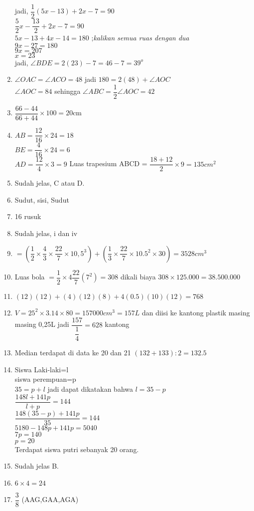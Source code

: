 \documentclass[10pt,a4paper]{article}
\begin{document}
\begin{enumerate}
		  jadi, $\dfrac{1}{2}(5x-13)+2x-7=90$\medskip \\
			    $\dfrac{5}{2}x-\dfrac{13}{2}+2x-7=90$ \medskip \\ 
			    $5x-13+4x-14=180$ ;\textit{kalikan semua ruas dengan dua}\\
			    $9x-27=180$\\
			    $9x=207$\\
			    $x=23$\\
		  jadi, $\angle BDE=2(23)-7=46-7=39^o$
	 \item $\angle OAC=\angle ACO= 48$ jadi $180=2(48)+ \angle AOC$\\
		   $\angle AOC=84$ sehingga $\angle ABC=\dfrac{1}{2} \angle AOC= 42$
	 \item $\dfrac{66-44}{66+44}\times 100 = 20 $cm 
	 \item $AB=\dfrac{12}{16}\times 24= 18$\\
		   $BE=\dfrac{4}{16}\times 24= 6$\\
		   $AD=\dfrac{12}{4}\times 3= 9$
		   Luas trapesium ABCD = $\dfrac{18+12}{2}\times 9=135cm^2 $
	\item Sudah jelas, C atau D.
	\item Sudut, sisi, Sudut
	\item 16 rusuk
	\item Sudah jelas, i dan iv
	\item $=(\dfrac{1}{2}\times \dfrac{4}{3}\times \dfrac{22}{7} \times 10,5^3)+(\dfrac{1}{3}\times \dfrac{22}{7}\times 10.5^2 \times 30)=3528cm^3$
	\item Luas bola $=\dfrac{1}{2}\times 4\dfrac{22}{7}(7^2)=308$ dikali biaya $308\times 125.000=38.500.000$
	\item $(12)(12)+(4)(12)(8)+4(0.5)(10)(12)=768$
	\item $V=25^2\times 3.14\times 80=157000cm^3=157L$ dan diisi ke kantong plastik masing masing 0,25L jadi $\dfrac{157}{\dfrac{1}{4}}=628$ kantong
	\item Median terdapat di data ke 20 dan 21 $(132+133):2=132.5 $
	\item Siswa Laki-laki=l\\ siswa perempuan=p\\
		  $35=p+l$ jadi dapat dikatakan bahwa $l=35-p$\medskip \\
		 $\dfrac{148l+141p}{l+p}=144$\medskip \\
		 $\dfrac{148(35-p)+141p}{35}=144$\medskip \\
		 $5180-148p+141p=5040$\\
		 $7p=140$\\
		 $p=20$\\
		 
		 Terdapat siswa putri sebanyak 20 orang.
	\item Sudah jelas B.
	\item $6\times 4=24$
	\item $\dfrac{3}{8}$ (AAG,GAA,AGA)
		 
	
		  
		  
	
	
	
	

	

	 
		
	
	
	
	
	\end{enumerate}
\end{document}
